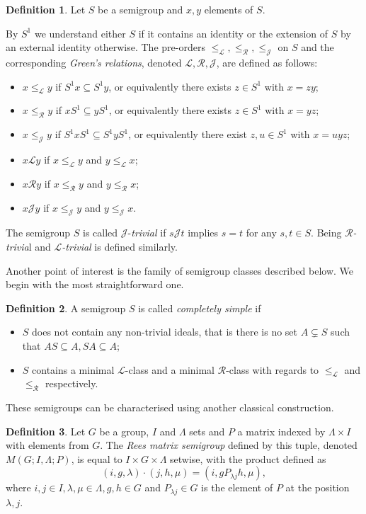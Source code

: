 \documentclass{article}
\theoremstyle{definition}
\newtheorem{definition}{Definition}
\def\L{\mathcal L}
\def\J{\mathcal J}
\def\RR{\mathcal R}
\def\L{\mathcal L}
\begin{document}
\begin{definition}\label{def_jtriv}
Let $S$ be a semigroup and $x,y$ elements of $S$.

By $S^1$ we understand either $S$ if it contains an identity or the extension of $S$ by an external identity otherwise. The pre-orders $\le_\L, \le_\RR, \le_\J$ on $S$ and the corresponding {\em Green's relations}, denoted $\L, \RR, \J$, are defined as follows:
\begin{itemize}
\item $x \le_\L y$ if $S^1  x\subseteq S^1 y$, or equivalently there exists $z \in S^1$ with $x = zy$;
\item $x \le_\RR y$ if $x S^1 \subseteq y S^1$, or equivalently there exists $z \in S^1$ with $x = yz$;
\item $x \le_\J y$ if $S^1  x S^1 \subseteq S^1 y S^1$, or equivalently there exist $z,u \in S^1$ with $x = uyz$;
\item $x \mathrel{\L} y$ if $x \le_\L y$ and $y \le_\L x$;
\item  $x \mathrel{\RR} y$ if $x \le_\RR y$ and $y \le_\RR x$;
\item $x \mathrel{\J} y$ if $x \le_\J y$ and $y \le_\J x$.
\end{itemize}

The semigroup $S$ is called $\J$-{\em trivial} if $s \mathrel{\J} t$ implies $s = t$ for any $s,t\in S$. Being {\em $\RR$-trivia}l and {\em $\L$-trivial} is defined similarly.
\end{definition}

Another point of interest is the family of semigroup classes described below. We begin with the most straightforward one.

\begin{definition}\label{def_compsimp}
A semigroup $S$ is called {\em completely simple} if 
\begin{itemize}
\item $S$ does not contain any non-trivial ideals, that is there is no set $A \subsetneq S$ such that $AS \subseteq A, SA \subseteq A$;
\item $S$ contains a minimal $\L$-class and a minimal $\RR$-class with regards to $\le_\L$ and $\le_\RR$ respectively.
\end{itemize}
\end{definition}

These semigroups can be characterised using another classical construction.

\begin{definition}\label{def_ReesM}
Let $G$ be a group, $I$ and $\Lambda$  sets and $P$ a matrix indexed by $\Lambda \times I$ with elements from $G$. The {\em Rees matrix semigroup} defined by this tuple, denoted $M(G; I, \Lambda; P)$, is equal to $I \times G \times \Lambda$ setwise, with the product defined as $$(i,g,\lambda) \cdot (j,h, \mu) = (i, g P_{\lambda j} h, \mu),$$
where $i, j \in I, \lambda, \mu \in \Lambda, g,h \in G$ and $P_{\lambda j} \in G$ is the element of $P$ at the position $\lambda, j$.
\end{definition}
\end{document}

